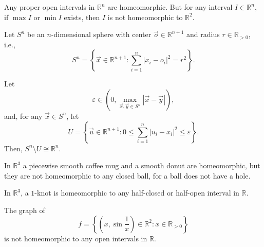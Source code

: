 \begin{example}
	Any proper open intervals in $\mathbb R^n$ are homeomorphic. But for any interval $I \in \mathbb R^n$, if $\max I$ or $\min I$ exists, then $I$ is not homeomorphic to $\mathbb R^2$.
\end{example}


\begin{example}
	Let $S^n$ be an $n$-dimensional sphere with center $\vec o \in \mathbb R^{n + 1}$ and radius $r \in \mathbb R_{>0}$, i.e.,
	$$
	S^n = \left\{ \vec x \in \mathbb R^{n + 1} : \sum_{i = 1}^n |x_i - o_i|^2 = r^2 \right\}.
	$$
	
	Let
	$$
	\varepsilon \in \left( 0, \max_{\vec x, \vec y \in S^n} |\vec x - \vec y| \right),
	$$
	and, for any $\vec x \in S^n$, let
	$$
	U = \left\{ \vec u \in \mathbb R^{n + 1} : 0 \le \sum_{i = 1}^n |u_i - x_i|^2 \le \varepsilon \right\}.
	$$
	Then, $S^n \setminus U \cong \mathbb R^n$.
\end{example}


\begin{example}
	In $\mathbb R^3$ a piecewise smooth coffee mug and a smooth donut are homeomorphic, but they are not homeomorphic to any closed ball, for a ball does not have a hole.
\end{example}


\begin{example}
	In $\mathbb R^3$, a $1$-knot is homeomorphic to any half-closed or half-open interval in $\mathbb R$.
\end{example}


\begin{example}
	The graph of
	$$
	f = \left\{ \left(x, \sin \frac{1}{x} \right) \in \mathbb R^2 : x \in \mathbb R_{> 0} \right\}
	$$
	is not homeomorphic to any open intervals in $\mathbb R$.
\end{example}








































